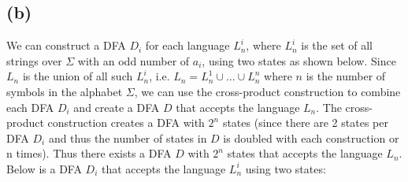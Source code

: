 \documentclass[12pt]{article}
\begin{document}
\subsection*{(b)}
  We can construct a DFA $D_i$ for each language $L^i_n$, where $L^i_n$ is the
  set of all strings over $\Sigma$ with an odd number of $a_i$, using two states
  as shown below. Since $L_n$ is the union of all such $L^i_n$, i.e.
  $L_n = L^1_n \cup \dots \cup L^n_n$ where $n$ is the number of symbols in the
  alphabet $\Sigma$, we can use the cross-product construction to combine each
  DFA $D_i$ and create a DFA $D$ that accepts the language $L_n$.
  The cross-product construction creates a DFA with $2^n$ states (since there
  are 2 states per DFA $D_i$ and thus the number of states in $D$ is doubled
  with each construction or n times). Thus there exists a DFA $D$ with $2^n$
  states that accepts the language $L_n$.
  \vspace{0.5cm}
  Below is a DFA $D_i$ that accepts the language $L^i_n$ using two states:
  \newline
  \begin{center}
  \end{center}
\end{document}
